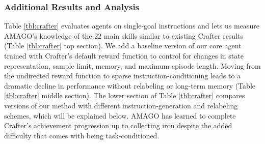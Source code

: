 \documentclass{article}
\begin{document}
\subsubsection{Additional Results and Analysis}
Table \ref{tbl:crafter} evaluates agents on single-goal instructions and lets us measure AMAGO's knowledge of the $22$ main skills similar to existing Crafter results (Table \ref{tbl:crafter} top section). We add a baseline version of our core agent trained with Crafter's default reward function to control for changes in state representation, sample limit, memory, and maximum episode length. Moving from the undirected reward function to sparse instruction-conditioning leads to a dramatic decline in performance without relabeling or long-term memory (Table \ref{tbl:crafter} middle section). The lower section of Table \ref{tbl:crafter} compares versions of our method with different instruction-generation and relabeling schemes, which will be explained below. AMAGO has learned to complete Crafter's achievement progression up to collecting iron despite the added difficulty that comes with being task-conditioned.
\end{document}
